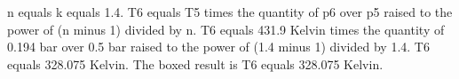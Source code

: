 n equals k equals 1.4.
T6 equals T5 times the quantity of p6 over p5 raised to the power of (n minus 1) divided by n.
T6 equals 431.9 Kelvin times the quantity of 0.194 bar over 0.5 bar raised to the power of (1.4 minus 1) divided by 1.4.
T6 equals 328.075 Kelvin.
The boxed result is T6 equals 328.075 Kelvin.
